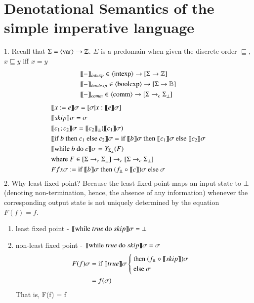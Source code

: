 \documentclass{report}[12pt]
\begin{document}
\section{Denotational Semantics of the simple imperative language}
1. Recall that $\Sigma = \langle \text{var}\rangle\rightarrow \mathbb{Z}$. $\Sigma$ is a predomain when given the discrete order $\sqsubseteq$, $x\sqsubseteq y$ iff $x=y$
\begin{align*}
    &\llbracket - \rrbracket_{intexp} \in \langle \text{intexp}\rangle \rightarrow [\Sigma \rightarrow \mathbb{Z}] \\
    &\llbracket - \rrbracket_{boolexp} \in \langle \text{boolexp}\rangle \rightarrow [\Sigma \rightarrow \mathbb{B}] \\
    &\llbracket - \rrbracket_{comm} \in \langle \text{comm}\rangle \rightarrow [\Sigma \rightarrow_c \Sigma_\bot]
\end{align*}
\begin{align*}
    &\interp{x:=e}\sigma = [\sigma | x:\interp{e}\sigma] \\
    &\interp{skip}\sigma = \sigma \\
    &\interp{c_1;c_2}\sigma = \interp{c_2}_\bbot (\interp{c_1}\sigma) \\
    &\interp{\text{if }b\text{ then }c_1 \text{ else }c_2} \sigma = \text{if }\interp{b}\sigma \text{ then }\interp{c_1}\sigma \text{ else }\interp{c_2}\sigma \\
    &\interp{\text{while }b\text{ do }c}\sigma = Y_{\Sigma_\bot}(F) \\
    &\text{where }F\in [\Sigma\rightarrow_c \Sigma_\bot] \rightarrow_c [\Sigma \rightarrow_c \Sigma_\bot] \\
    &F f x \sigma := \text{if }\interp{b}\sigma \text{ then }(f_\bbot \circ \interp{c}) \sigma \text{ else }\sigma
\end{align*}
2. Why least fixed point? Because the least fixed point maps an input state to $\bot$ (denoting non-termination, hence, the absence of any information) whenever the corresponding output state is not uniquely determined by the equation $F(f)=f$.
\begin{enumerate}
    \item least fixed point - $\llbracket \text{while }true \text{ do }skip \rrbracket\sigma = \bot$
    \item non-least fixed point - $\llbracket \text{while }true \text{ do }skip \rrbracket\sigma = \sigma$
    \begin{align}
        F(f)\sigma &= \text{if }\interp{true}\sigma \begin{cases}
            \text{ then }(f_\bbot \circ \interp{skip})\sigma \\
            \text{ else }\sigma
        \end{cases} \\
        &= f(\sigma)
    \end{align}
    That is, F(f) = f
\end{enumerate}
\end{document}
